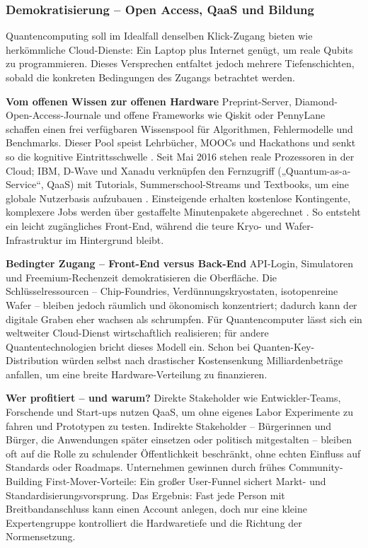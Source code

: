 {\subsubsection{Demokratisierung – Open Access, QaaS und Bildung}
Quantencomputing soll im Idealfall denselben Klick-Zugang bieten wie herkömmliche Cloud-Dienste: Ein Laptop plus Internet genügt, um reale Qubits zu programmieren. Dieses Versprechen entfaltet jedoch mehrere Tiefenschichten, sobald die konkreten Bedingungen des Zugangs betrachtet werden.

\textbf{Vom offenen Wissen zur offenen Hardware}
Preprint-Server, Diamond-Open-Access-Journale und offene Frameworks wie Qiskit oder PennyLane schaffen einen frei verfügbaren Wissenspool für Algorithmen, Fehlermodelle und Benchmarks. Dieser Pool speist Lehrbücher, MOOCs und Hackathons und senkt so die kognitive Eintrittsschwelle .
Seit Mai 2016 stehen reale Prozessoren in der Cloud; IBM, D-Wave und Xanadu verknüpfen den Fernzugriff („Quantum-as-a-Service“, QaaS) mit Tutorials, Summerschool-Streams und Textbooks, um eine globale Nutzerbasis aufzubauen . Einsteigende erhalten kostenlose Kontingente, komplexere Jobs werden über gestaffelte Minutenpakete abgerechnet . So entsteht ein leicht zugängliches Front-End, während die teure Kryo- und Wafer-Infrastruktur im Hintergrund bleibt.\cite{seskirDemocratizationQuantumTechnologies2022}

\textbf{Bedingter Zugang – Front-End versus Back-End}
API-Login, Simulatoren und Freemium-Rechenzeit demokratisieren die Oberfläche. Die Schlüsselressourcen – Chip-Foundries, Verdünnungskryostaten, isotopenreine Wafer – bleiben jedoch räumlich und ökonomisch konzentriert; dadurch kann der digitale Graben eher wachsen als schrumpfen.
Für Quantencomputer lässt sich ein weltweiter Cloud-Dienst wirtschaftlich realisieren; für andere Quantentechnologien bricht dieses Modell ein. Schon bei Quanten-Key-Distribution würden selbst nach drastischer Kostensenkung Milliardenbeträge anfallen, um eine breite Hardware-Verteilung zu finanzieren.\cite{seskirDemocratizationQuantumTechnologies2022}

\textbf{Wer profitiert – und warum?}
Direkte Stakeholder wie Entwickler-Teams, Forschende und Start-ups nutzen QaaS, um ohne eigenes Labor Experimente zu fahren und Prototypen zu testen.
Indirekte Stakeholder – Bürgerinnen und Bürger, die Anwendungen später einsetzen oder politisch mitgestalten – bleiben oft auf die Rolle zu schulender Öffentlichkeit beschränkt, ohne echten Einfluss auf Standards oder Roadmaps.
Unternehmen gewinnen durch frühes Community-Building First-Mover-Vorteile: Ein großer User-Funnel sichert Markt- und Standardisierungsvorsprung.
Das Ergebnis: Fast jede Person mit Breitbandanschluss kann einen Account anlegen, doch nur eine kleine Expertengruppe kontrolliert die Hardwaretiefe und die Richtung der Normensetzung.\cite{seskirDemocratizationQuantumTechnologies2022}

}
